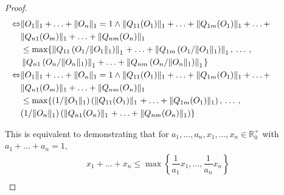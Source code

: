 \begin{proof}
\begin{align*}
  \hspace{-30pt} \Leftrightarrow  & \lVert O_1  \rVert_1  + \ldots + \lVert O_n  \rVert_1 = 1  \wedge  \lVert Q_{11} (O_{1}) \rVert_{1} + \ldots +  \lVert Q_{1m} (O_{1}) \rVert_{1} + \ldots +  \hspace{10pt}\\
  \hspace{-30pt} & \lVert Q_{n1} (O_{m}) \rVert_{1} +  \ldots  + \lVert Q_{nm} (O_{n}) \rVert_{1}   \\
  \hspace{-30pt}& \leq \max \{ \left\lVert Q_{11} \left(O_{1} / \lVert O_{1} \rVert_1\right) \right\rVert_{1} \hspace{1pt} + \ldots +  \left\lVert Q_{1m}  \left(O_{1} / \lVert O_{1} \rVert_1\right) \right\rVert_{1}, \hspace{2pt} \ldots \hspace{2pt},   \\
  \hspace{-30pt}& \left\lVert Q_{n1}  \left(O_{n} / \lVert O_{n} \rVert_1\right) \right\rVert_{1} + \ldots + \left\lVert Q_{nm}   \left(O_{n} / \lVert O_{n} \rVert_1\right) \right\rVert_{1} \hspace{1pt} \}  \\
  \hspace{-30pt} \Leftrightarrow  & \lVert O_1  \rVert_1  + \ldots + \lVert O_n  \rVert_1 = 1  \wedge  \lVert Q_{11} (O_{1}) \rVert_{1} + \ldots +  \lVert Q_{1m} (O_{1}) \rVert_{1} + \ldots +  \hspace{10pt}\\
  \hspace{-30pt} & \lVert Q_{n1} (O_{m}) \rVert_{1} +  \ldots  + \lVert Q_{nm} (O_{n}) \rVert_{1}   \\
  \hspace{-30pt}& \leq \max \{ (1 / \lVert O_{1} \rVert_1)   \left(\lVert Q_{11} (O_{1}) \rVert_{1} \hspace{1pt} + \ldots +  \lVert Q_{1m} (O_{1})\rVert_{1} \right), \hspace{2pt} \ldots \hspace{2pt},   \\
  \hspace{-30pt}& (1 / \lVert O_{n} \rVert_1)   \left(\lVert Q_{n1} (O_{n}) \rVert_{1} \hspace{1pt} + \ldots +  \lVert Q_{nm} (O_{n})\rVert_{1} \right) \}  
  \end{align*}

  This is equivalent to demonstrating that for $a_1, \ldots, a_n, x_1, \ldots, x_n \in \mathbb{R}^{+}_{0}$ with $a_1+ \ldots + a_n=1$,
  \begin{equation} 
  \begin{split}
      x_1 + \ldots + x_n  \leq  \max \left\{   \dfrac{1}{a_1} x_1  , \ldots , \dfrac{1}{a_n} x_n   \right\} \\
  \end{split}
  \end{equation}


\end{proof}
